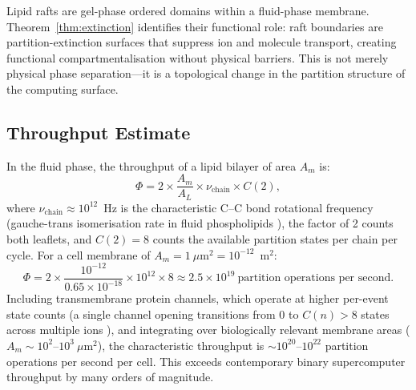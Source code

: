 \documentclass[11pt,twocolumn,a4paper]{article}
\theoremstyle{definition}
\theoremstyle{remark}
\begin{document}
Lipid rafts \citep{simons1997} are gel-phase ordered domains within a
fluid-phase membrane. Theorem~\ref{thm:extinction} identifies their
functional role: raft boundaries are partition-extinction surfaces that
suppress ion and molecule transport, creating functional compartmentalisation
without physical barriers. This is not merely physical phase separation---it
is a topological change in the partition structure of the computing surface.

\subsection{Throughput Estimate}

In the fluid phase, the throughput of a lipid bilayer of area $A_m$ is:
\begin{equation}
\Phi = 2 \times \frac{A_m}{A_L} \times \nu_{\text{chain}} \times C(2),
\label{eq:throughput}
\end{equation}
where $\nu_{\text{chain}} \approx 10^{12}$~Hz is the characteristic C--C
bond rotational frequency (gauche-trans isomerisation rate in fluid
phospholipids \citep{bloom1991}), the factor of 2 counts both leaflets, and
$C(2) = 8$ counts the available partition states per chain per cycle.
For a cell membrane of $A_m = 1~\mu\text{m}^2 = 10^{-12}$~m$^2$:
\begin{equation}
\Phi = 2 \times \frac{10^{-12}}{0.65 \times 10^{-18}} \times 10^{12} \times 8
\approx 2.5 \times 10^{19}\ \text{partition operations per second.}
\label{eq:phi_value}
\end{equation}
Including transmembrane protein channels, which operate at higher per-event
state counts (a single channel opening transitions from 0 to $C(n) > 8$ states
across multiple ions \citep{hille2001}), and integrating over biologically
relevant membrane areas ($A_m \sim 10^2$--$10^3\ \mu\text{m}^2$), the
characteristic throughput is $\sim 10^{20}$--$10^{22}$ partition operations
per second per cell. This exceeds contemporary binary supercomputer throughput
by many orders of magnitude.
\end{document}
